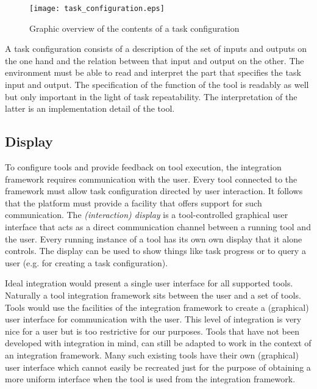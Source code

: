 \documentclass{article}
\begin{document}
   \begin{figure}[H]
    \begin{center}
     \texttt{[image: task\_configuration.eps]}
    \end{center}
    \caption{Graphic overview of the contents of a task configuration}
   \end{figure}

   \noindent A task configuration consists of a description of the set of
   inputs and outputs on the one hand and the relation between that input and
   output on the other. The environment must be able to read and interpret the
   part that specifies the task input and output. The specification of the
   function of the tool is readably as well but only important in the light of
   task repeatability. The interpretation of the latter is an implementation
   detail of the tool.
   


  \subsection{Display}

   To configure tools and provide feedback on tool execution, the integration
   framework requires communication with the user. Every tool connected to the
   framework must allow task configuration directed by user interaction. It
   follows that the platform must provide a facility that offers support for
   such communication.  The \textit{(interaction) display} is a tool-controlled
   graphical user interface that acts as a direct communication channel between
   a running tool and the user. Every running instance of a tool has its own
   own display that it alone controls. The display can be used to show things
   like task progress or to query a user (e.g. for creating a task
   configuration).

   Ideal integration would present a single user interface for all supported
   tools. Naturally a tool integration framework sits between the user and a
   set of tools. Tools would use the facilities of the integration framework to
   create a (graphical) user interface for communication with the user. This
   level of integration is very nice for a user but is too restrictive for our
   purposes.  Tools that have not been developed with integration in mind, can
   still be adapted to work in the context of an integration framework.  Many
   such existing tools have their own (graphical) user interface which cannot
   easily be recreated just for the purpose of obtaining a more uniform
   interface when the tool is used from the integration framework.
\end{document}
